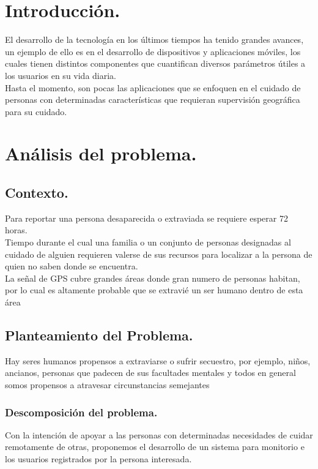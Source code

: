 \documentclass[10pt]{article}
\begin{document}
\section{Introducción.}
El desarrollo de la tecnología en los últimos tiempos ha tenido grandes avances, un ejemplo de ello es en el desarrollo de dispositivos y aplicaciones móviles, los cuales tienen distintos componentes que cuantifican diversos parámetros útiles a los usuarios en su vida diaria. \\

Hasta el momento, son pocas las aplicaciones que se enfoquen en el cuidado de personas con determinadas características que requieran supervisión geográfica para su cuidado.

\newpage 
\section{Análisis del problema.}
\subsection{Contexto.}
Para reportar una persona desaparecida o extraviada se requiere esperar 72 horas. \\

Tiempo durante el cual una familia o un conjunto de personas designadas al cuidado de alguien requieren valerse de sus recursos para localizar a la persona de quien no saben donde se encuentra. \\

La señal de GPS cubre grandes áreas donde gran numero de personas habitan, por lo cual es altamente probable que se extravié un ser humano dentro de esta área   

\subsection{Planteamiento del Problema.} 
Hay seres humanos propensos a extraviarse o sufrir secuestro, por ejemplo, niños, ancianos, personas que padecen de sus facultades mentales y todos en general somos propensos a atravesar circunstancias semejantes


\subsubsection{Descomposición del problema.}
Con la intención de apoyar a las personas con determinadas necesidades de cuidar remotamente de otras, proponemos el desarrollo de un sistema para monitorio e los usuarios registrados por la persona interesada.
\end{document}

